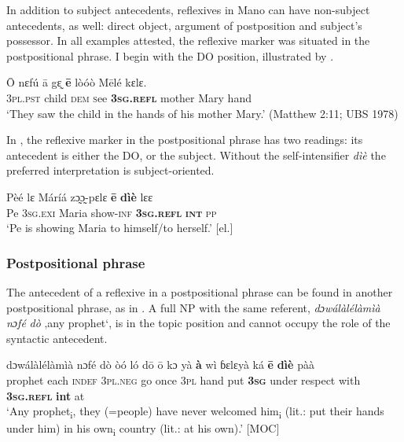 \documentclass[output=paper]{langscibook}
\begin{document}
In addition to subject antecedents, reflexives in Mano can have non-subject antecedents, as well: direct object, argument of postposition and subject’s possessor. In all examples attested, the reflexive marker was situated in the postpositional phrase. I begin with the DO position, illustrated by .

\ea
    \label{ex:Kachaturyan:31} 
 \gll Ō nɛfú ā gɛ̰ \textbf{ē} lòóò Mēlé kɛlɛ. \\
     3\textsc{pl.pst} child \textsc{dem} \textsc{s}ee \textbf{\textsc{3sg.refl}} mother Mary hand\\
\glt ‘They saw the child in the hands of his mother Mary.’ (Matthew 2:11; UBS 1978)
\z

In , the reflexive marker in the postpositional phrase has two readings: its antecedent is either the DO, or the subject. Without the self-intensifier \textit{dìè} the preferred interpretation is subject-oriented. 

\ea
    \label{ex:Kachaturyan:32} 
 \gll Pèé  lɛ  Máríá  zɔ̰ɔ̰-pɛlɛ  \textbf{ē}  \textbf{dìè}  lɛɛ  \\
     Pe  \textsc{3sg.exi}  Maria  show-\textsc{inf}  \textbf{\textsc{3sg.refl}}  \textbf{\textsc{int} }\textsc{pp}  \\
\glt ‘Pe is showing Maria to himself/to herself.’ [el.]
\z


 \subsubsection{Postpositional phrase}\label{sec:Kachaturyan:5.3.2}


The antecedent of a reflexive in a postpositional phrase can be found in another postpositional phrase, as in . A full NP with the same referent, \textit{dɔwálàlélàmìà} \textit{nɔfé} \textit{dò} ‚any prophet‘, is in the topic position and cannot occupy the role of the syntactic antecedent.

\ea
    \label{ex:Kachaturyan:33} 
 \gll dɔwálàlélàmìà  nɔfé  dò  òó  ló  dō  ō  kɔ  yà  \textbf{à}  wì  ɓɛlɛyà  ká  \textbf{ē}  \textbf{dìè}  pàà\\
     prophet  each  \textsc{indef}  \textsc{3pl.neg}  go  once  \textsc{3pl}  hand  put  \textbf{\textsc{3sg}} under  respect  with  \textbf{\textsc{3sg.refl}}  \textbf{{int}}  at\\
\glt ‘Any prophet\textsubscript{i}, they (=people) have never welcomed him\textsubscript{i} (lit.: put their hands under him) in his own\textsubscript{i} country (lit.: at his own).’ [MOC]
\z
\end{document}
